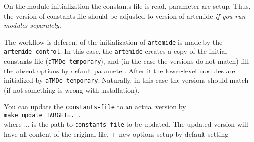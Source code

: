 \documentclass[prd,nofootinbib,eqsecnum,final]{revtex4}
\renewcommand{\(}{\left(}
\renewcommand{\)}{\right)}
\renewcommand{\[}{\left[}
\renewcommand{\]}{\right]}
\begin{document}
On the module initialization the constants file is read, parameter are setup. Thus, the version of constants file should be adjusted to version of artemide \textit{if you run modules separately}.

The workflow is deferent of the initialization of \texttt{artemide} is made by the \texttt{artemide\_control}. In this case, the \texttt{artemide} creates a copy of the initial constants-file (\texttt{aTMDe\_temporary}), and (in the case the versions do not match) fill the absent options by default parameter. After it the lower-level modules are initialized by \texttt{aTMDe\_temporary}. Naturally, in this case the versions should match (if not something is wrong with installation).

\begin{tcolorbox}
You can update the \texttt{constants-file} to an actual version by 
\\
\texttt{make update TARGET=...}
\\
where ... is the path to \texttt{constants-file} to be updated. The updated version will have all content of the original file, + new options setup by default setting.
\end{tcolorbox}
\end{document}
